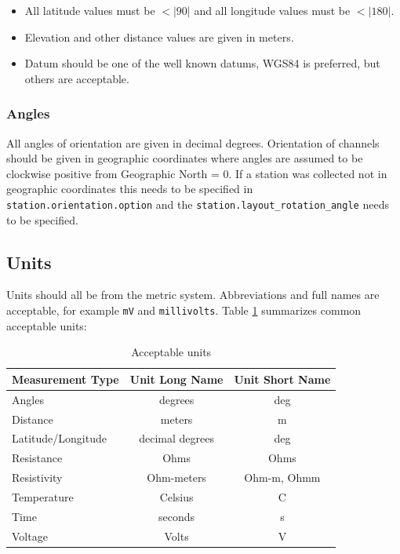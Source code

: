 \documentclass{article}
\begin{document}
\begin{itemize}
	\setlength\itemsep{0em}
	\item All latitude values must be $<|90|$ and all longitude values must be $<|180|$.
	\item Elevation and other distance values are given in meters.
	\item Datum should be one of the well known datums, WGS84 is preferred, but others are acceptable.
\end{itemize} 

\subsubsection{Angles}

All angles of orientation are given in decimal degrees.  Orientation of channels should be given in geographic coordinates where angles are assumed to be clockwise positive from Geographic North = 0.  If a station was collected not in geographic coordinates this needs to be specified in \verb|station.orientation.option| and the \verb|station.layout_rotation_angle| needs to be specified.   

\subsection{Units}
Units should all be from the metric system.  Abbreviations and full names are acceptable, for example \verb|mV| and \verb|millivolts|.  Table \ref{tab:units} summarizes common acceptable units:


\begin{table}[h!]
	\centering
	\caption[Acceptable units]{Acceptable units}
	\begin{tabular}{|l|c|c|}
		\hline
		\textbf{Measurement Type} & \textbf{Unit Long Name}  & \textbf{Unit Short Name} \\ \hline
		Angles & degrees & deg \\ \hline
		
		Distance &  meters & m \\ \hline
		Latitude/Longitude & decimal degrees & deg \\ \hline
		Resistance & Ohms  &  Ohms \\ \hline
		Resistivity & Ohm-meters & Ohm-m, Ohmm \\ \hline
		Temperature & Celsius & C \\ \hline
		Time & seconds & s \\ \hline
		Voltage & Volts & V \\ \hline
		
		
	\end{tabular}
	\label{tab:units}
\end{table}
\end{document}
